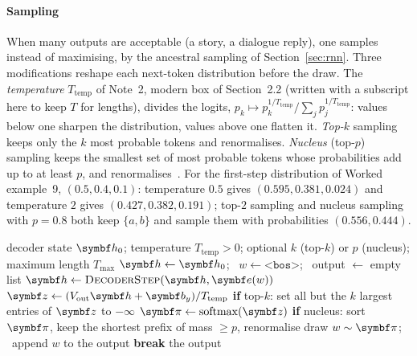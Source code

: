 \documentclass[11pt]{article}
\newcommand{\hv}{\vect{h}}
\newcommand{\bv}{\vect{b}}
\newcommand{\zv}{\vect{z}}
\newcommand{\ev}{\vect{e}}
\newcommand{\softmax}{\operatorname{softmax}}
\newcommand{\bos}{\texttt{<bos>}}
\newcommand{\eos}{\texttt{<eos>}}
\begin{document}
\paragraph{Sampling} When many outputs are acceptable (a story, a dialogue reply), one samples instead of maximising,
by the ancestral sampling of Section~\ref{sec:rnn}. Three modifications reshape each next-token distribution before
the draw. The \emph{temperature} $T_{\mathrm{temp}}$ of Note~2, modern box of Section~2.2 (written with a
subscript here to keep $T$ for lengths), divides the logits, $p_k \mapsto p_k^{1/T_{\mathrm{temp}}}/\sum_j
p_j^{1/T_{\mathrm{temp}}}$: values below one sharpen the distribution, values above one flatten it. \emph{Top-$k$}
sampling keeps only the $k$ most probable tokens and renormalises. \emph{Nucleus} (top-$p$) sampling keeps the smallest
set of most probable tokens whose probabilities add up to at least $p$, and renormalises~\cite{holtzman2020}. For the
first-step distribution of Worked example~9, $(0.5, 0.4, 0.1)$: temperature $0.5$ gives $(0.595, 0.381, 0.024)$ and
temperature $2$ gives $(0.427, 0.382, 0.191)$; top-$2$ sampling and nucleus sampling with $p = 0.8$ both keep $\{a, b\}$ and
sample them with probabilities $(0.556, 0.444)$.

\begin{algorithm}[htbp]
\caption{Autoregressive generation with temperature, top-$k$ and nucleus sampling}\label{alg:sample}
\begin{algorithmic}[1]
\Require decoder state $\hv_0$; temperature $T_{\mathrm{temp}} > 0$; optional $k$ (top-$k$) or $p$ (nucleus); maximum
  length $T_{\max}$
\Function{Sample}{$\hv_0$}
  \State $\hv \gets \hv_0$; \ $w \gets \bos$; \ output $\gets$ empty list
    \State $\hv \gets \textsc{DecoderStep}(\hv, \ev(w))$ 
    \State $\zv \gets (V_{\mathrm{out}}\hv + \bv_y)/T_{\mathrm{temp}}$ 
    \State \textbf{if} top-$k$: set all but the $k$ largest entries of $\zv$ to $-\infty$ 
    \State $\vect{\pi} \gets \softmax(\zv)$
    \State \textbf{if} nucleus: sort $\vect{\pi}$, keep the shortest prefix of mass $\ge p$, renormalise
    \State draw $w \sim \vect{\pi}$; \ append $w$ to the output 
    \If{$w = \eos$} \textbf{break} \EndIf
  \EndFor
  \State \Return the output
\EndFunction
\end{algorithmic}
\end{algorithm}
\end{document}
